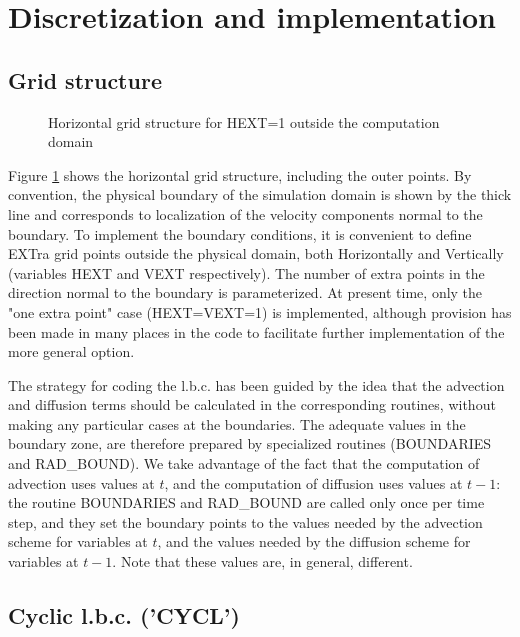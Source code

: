 \section{Discretization and implementation}

\subsection{Grid structure}

\begin{figure}[pbh]
\caption{Horizontal grid structure for HEXT=1  outside the computation domain
\label{horzgrdlbc} }
\end{figure}

Figure \ref{horzgrdlbc} shows the horizontal grid structure, including the
outer points. By convention, the physical boundary of the simulation domain
is shown by the
thick line and corresponds to localization of the velocity components normal to
the boundary. To implement the boundary conditions, it is convenient to
define EXTra grid points outside the physical domain, both Horizontally and
Vertically (variables HEXT and VEXT respectively). The number of extra points
in the direction normal to the boundary is parameterized. At present time,
only the "one extra point" case (HEXT=VEXT=1) is implemented, although
provision has been made in many places in the code to facilitate further
implementation of the more general option.

The strategy for coding the l.b.c. has been guided by the idea that
the advection and diffusion terms should be calculated in the corresponding
routines, without making any particular cases at the boundaries.
The adequate values in the boundary zone, are therefore prepared by
specialized routines (BOUNDARIES and RAD\_BOUND). We take advantage of the
fact that the computation of advection uses values at $t$, and the
computation of diffusion uses values at $t-1$: the routine BOUNDARIES and
RAD\_BOUND are called only once per time step, and they set the boundary
points to the values needed by the advection scheme for variables at $t$,
and the values needed by the diffusion scheme for variables at $t-1$. Note
that these values are, in general, different.



\subsection{Cyclic l.b.c. ('CYCL')}

